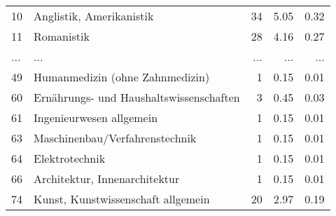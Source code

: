 \begin{longtable}{lXrrr}
        10 & \multicolumn{1}{X}{Anglistik, Amerikanistik} & %
          \num{34} &
          \num[round-mode=places,round-precision=2]{5.05} &
          \num[round-mode=places,round-precision=2]{0.32} \\
        11 & \multicolumn{1}{X}{Romanistik} & %
          \num{28} &
          \num[round-mode=places,round-precision=2]{4.16} &
          \num[round-mode=places,round-precision=2]{0.27} \\
       ... & ... & ... & ... & ... \\
        49 & \multicolumn{1}{X}{Humanmedizin (ohne Zahnmedizin)} & %
          \num{1} &
          \num[round-mode=places,round-precision=2]{0.15} &
          \num[round-mode=places,round-precision=2]{0.01} \\

        60 & \multicolumn{1}{X}{Ernährungs- und Haushaltswissenschaften} & %
          \num{3} &
          \num[round-mode=places,round-precision=2]{0.45} &
          \num[round-mode=places,round-precision=2]{0.03} \\

        61 & \multicolumn{1}{X}{Ingenieurwesen allgemein} & %
          \num{1} &
          \num[round-mode=places,round-precision=2]{0.15} &
          \num[round-mode=places,round-precision=2]{0.01} \\

        63 & \multicolumn{1}{X}{Maschinenbau/Verfahrenstechnik} & %
          \num{1} &
          \num[round-mode=places,round-precision=2]{0.15} &
          \num[round-mode=places,round-precision=2]{0.01} \\

        64 & \multicolumn{1}{X}{Elektrotechnik} & %
          \num{1} &
          \num[round-mode=places,round-precision=2]{0.15} &
          \num[round-mode=places,round-precision=2]{0.01} \\

        66 & \multicolumn{1}{X}{Architektur, Innenarchitektur} & %
          \num{1} &
          \num[round-mode=places,round-precision=2]{0.15} &
          \num[round-mode=places,round-precision=2]{0.01} \\

        74 & \multicolumn{1}{X}{Kunst, Kunstwissenschaft allgemein} & %
          \num{20} &
          \num[round-mode=places,round-precision=2]{2.97} &
          \num[round-mode=places,round-precision=2]{0.19} \\


\end{longtable}
